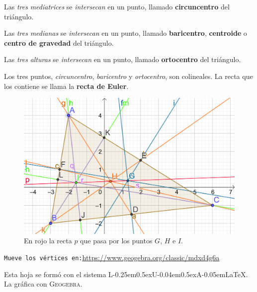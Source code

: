 \documentclass[12pt,letterpaper]{article}
\newcommand{\LuaLaTeX}{L\kern-0.25em\raise0.5ex\hbox{\tiny U}\kern-0.04em\raise0.5ex\hbox{\tiny A}\kern-0.05em\LaTeX}
\begin{document}
Las \emph{tres} \emph{mediatrices} se \emph{\color{purple}intersecan} en un punto, llamado \textbf{\color{purple}circuncentro} del triángulo.

Las \emph{tres} \emph{medianas} se \emph{\color{purple}intersecan} en un punto, llamado \textbf{\color{purple}baricentro}, \textbf{\color{purple}centroide} o \textbf{\color{purple}centro de gravedad} del triángulo.

Las \emph{tres} \emph{alturas} se \emph{\color{purple}intersecan} en un punto, llamado \textbf{\color{purple}ortocentro} del triángulo.
\smallskip

Los tres puntos, \emph{circuncentro}, \emph{baricentro} y \emph{ortocentro}, son colineales. La recta que los contiene se llama la \textbf{\color{purple}recta de Euler}. 
\begin{figure}[ht]
	\centering
	\includegraphics[scale=0.6]{img/CircBarOrt-Triangc.png}
	\caption{En rojo la recta $p$ que pasa por los puntos $G$, $H$ e $I$.}\label{fig:circbarort}
\end{figure}

\vfill 

\begin{center}
	\texttt{\color{brown}Mueve los vértices en:}\enspace \url{https://www.geogebra.org/classic/mdxd4g6a}
\end{center}

\begin{center}
	{\footnotesize\color{olive} Esta hoja se formó con el sistema \LuaLaTeX. La gráfica con \textsc{Geogebra}.}
\end{center}
\end{document}
